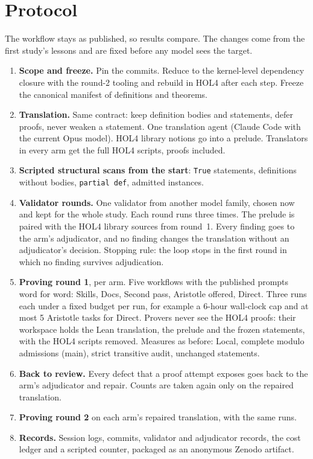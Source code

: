 \documentclass[11pt,a4paper]{article}
\newcommand{\code}[1]{\texttt{#1}}
\begin{document}
\section{Protocol}
The workflow stays as published, so results compare. The changes come from the first study's lessons and are fixed before any model sees the target.
\begin{enumerate}
\item \textbf{Scope and freeze.} Pin the commits. Reduce to the kernel-level dependency closure with the round-2 tooling and rebuild in HOL4 after each step. Freeze the canonical manifest of definitions and theorems.
\item \textbf{Translation.} Same contract: keep definition bodies and statements, defer proofs, never weaken a statement. One translation agent (Claude Code with the current Opus model). HOL4 library notions go into a prelude. Translators in every arm get the full HOL4 scripts, proofs included.
\item \textbf{Scripted structural scans from the start}: \code{True} statements, definitions without bodies, \code{partial def}, admitted instances.
\item \textbf{Validator rounds.} One validator from another model family, chosen now and kept for the whole study. Each round runs three times. The prelude is paired with the HOL4 library sources from round~1. Every finding goes to the arm's adjudicator, and no finding changes the translation without an adjudicator's decision. Stopping rule: the loop stops in the first round in which no finding survives adjudication.
\item \textbf{Proving round 1}, per arm. Five workflows with the published prompts word for word: Skills, Docs, Second pass, Aristotle offered, Direct. Three runs each under a fixed budget per run, for example a 6-hour wall-clock cap and at most 5 Aristotle tasks for Direct. Provers never see the HOL4 proofs: their workspace holds the Lean translation, the prelude and the frozen statements, with the HOL4 scripts removed. Measures as before: Local, complete modulo admissions (main), strict transitive audit, unchanged statements.
\item \textbf{Back to review.} Every defect that a proof attempt exposes goes back to the arm's adjudicator and repair. Counts are taken again only on the repaired translation.
\item \textbf{Proving round 2} on each arm's repaired translation, with the same runs.
\item \textbf{Records.} Session logs, commits, validator and adjudicator records, the cost ledger and a scripted counter, packaged as an anonymous Zenodo artifact.
\end{enumerate}
\end{document}
